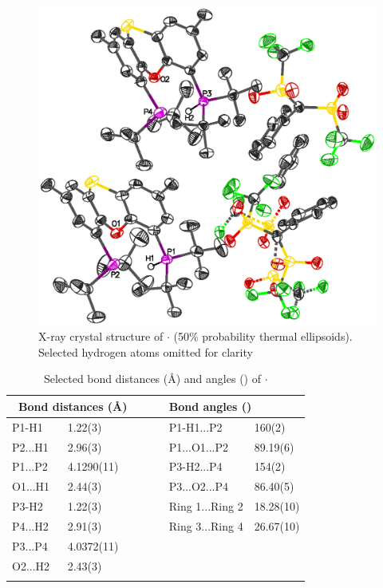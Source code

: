 {\begin{figure}[hp!]
\begin{center}
\includegraphics{../Crystalstructures/mrmnb.eps}
\caption[X-ray crystal structure of ]{X-ray crystal structure of $\cdot{}$  (50\% probability thermal ellipsoids).  Selected hydrogen atoms omitted for clarity}
\label{Crystalprotonated}
\end{center}
\end{figure}

\begin{table}[htp]
\small
\caption[Selected bond distances (\AA) and angles (\degrees) of \ce{StBu-xantphos(H)]CPh(SO2CF3)2}$\cdot{}$ ]{Selected bond distances (\AA) and angles (\degrees) of \ce{StBu-xantphos(H)]CPh(SO2CF3)2}$\cdot{}$ } 
\vspace{1em}
\label{table:crystalprotonated:lengths}
\begin{center}
\begin{tabular}{l l l l l}
	\toprule
	\multicolumn{2}{l}{\bfseries{~Bond distances (\si{\angstrom})}} &~~~& \multicolumn{2}{l}{\bfseries{Bond angles (\degrees)}} \\
	\midrule		
	P1-H1	& 1.22(3)		&~~~& P1-H1...P2	& 160(2)\\
	P2...H1	& 2.96(3)		&~~~& P1...O1...P2	& 89.19(6)\\
	P1...P2	& 4.1290(11)	&~~~& P3-H2...P4	& 154(2)\\
	O1...H1	& 2.44(3)		&~~~& P3...O2...P4	& 86.40(5)\\
	P3-H2	& 1.22(3)		&~~~& Ring 1...Ring 2 & 18.28(10)\\
	P4...H2	& 2.91(3)		&~~~& Ring 3...Ring 4 & 26.67(10)\\
	P3...P4	& 4.0372(11)	&~~~& ~			& ~\\
	O2...H2	& 2.43(3)		&~~~& ~			& ~\\
	\bottomrule{}
\end{tabular}
\end{center}
\end{table}

}

